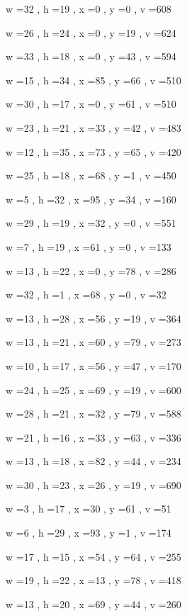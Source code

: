 \documentclass[11pt]{article}
\begin{document}
w =32 , h =19 , x =0 , y =0 , v =608
\par
w =26 , h =24 , x =0 , y =19 , v =624
\par
w =33 , h =18 , x =0 , y =43 , v =594
\par
w =15 , h =34 , x =85 , y =66 , v =510
\par
w =30 , h =17 , x =0 , y =61 , v =510
\par
w =23 , h =21 , x =33 , y =42 , v =483
\par
w =12 , h =35 , x =73 , y =65 , v =420
\par
w =25 , h =18 , x =68 , y =1 , v =450
\par
w =5 , h =32 , x =95 , y =34 , v =160
\par
w =29 , h =19 , x =32 , y =0 , v =551
\par
w =7 , h =19 , x =61 , y =0 , v =133
\par
w =13 , h =22 , x =0 , y =78 , v =286
\par
w =32 , h =1 , x =68 , y =0 , v =32
\par
w =13 , h =28 , x =56 , y =19 , v =364
\par
w =13 , h =21 , x =60 , y =79 , v =273
\par
w =10 , h =17 , x =56 , y =47 , v =170
\par
w =24 , h =25 , x =69 , y =19 , v =600
\par
w =28 , h =21 , x =32 , y =79 , v =588
\par
w =21 , h =16 , x =33 , y =63 , v =336
\par
w =13 , h =18 , x =82 , y =44 , v =234
\par
w =30 , h =23 , x =26 , y =19 , v =690
\par
w =3 , h =17 , x =30 , y =61 , v =51
\par
w =6 , h =29 , x =93 , y =1 , v =174
\par
w =17 , h =15 , x =54 , y =64 , v =255
\par
w =19 , h =22 , x =13 , y =78 , v =418
\par
w =13 , h =20 , x =69 , y =44 , v =260
\par
\newpage
\end{document}
